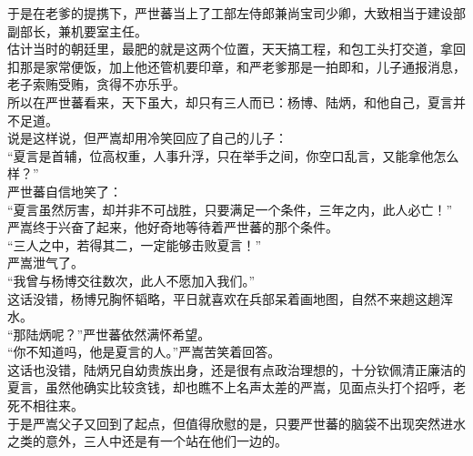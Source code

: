 \begin{multicols}{\theparacolNo}
于是在老爹的提携下，严世蕃当上了工部左侍郎兼尚宝司少卿，大致相当于建设部副部长，兼机要室主任。\\

估计当时的朝廷里，最肥的就是这两个位置，天天搞工程，和包工头打交道，拿回扣那是家常便饭，加上他还管机要印章，和严老爹那是一拍即和，儿子通报消息，老子索贿受贿，贪得不亦乐乎。\\

所以在严世蕃看来，天下虽大，却只有三人而已：杨博、陆炳，和他自己，夏言并不足道。\\

说是这样说，但严嵩却用冷笑回应了自己的儿子：\\

“夏言是首辅，位高权重，人事升浮，只在举手之间，你空口乱言，又能拿他怎么样？”\\

严世蕃自信地笑了：\\

“夏言虽然厉害，却并非不可战胜，只要满足一个条件，三年之内，此人必亡！”\\

严嵩终于兴奋了起来，他好奇地等待着严世蕃的那个条件。\\

“三人之中，若得其二，一定能够击败夏言！”\\

严嵩泄气了。\\

“我曾与杨博交往数次，此人不愿加入我们。”\\

这话没错，杨博兄胸怀韬略，平日就喜欢在兵部呆着画地图，自然不来趟这趟浑水。\\

“那陆炳呢？”严世蕃依然满怀希望。\\

“你不知道吗，他是夏言的人。”严嵩苦笑着回答。\\

这话也没错，陆炳兄自幼贵族出身，还是很有点政治理想的，十分钦佩清正廉洁的夏言，虽然他确实比较贪钱，却也瞧不上名声太差的严嵩，见面点头打个招呼，老死不相往来。\\

于是严嵩父子又回到了起点，但值得欣慰的是，只要严世蕃的脑袋不出现突然进水之类的意外，三人中还是有一个站在他们一边的。\\
\ifnum{}
	\end{multicols}
\fi
\newpage
